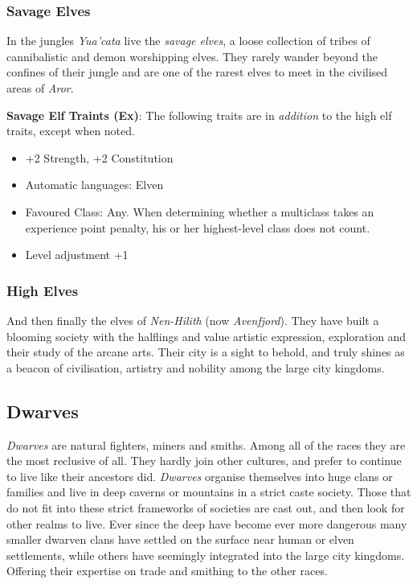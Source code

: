 \subsubsection*{Savage Elves}

In the jungles \emph{Yua'cata} live the \emph{savage elves}, a loose
collection of tribes of cannibalistic and demon worshipping elves. They rarely
wander beyond the confines of their jungle and are one of the rarest elves to
meet in the civilised areas of \emph{Aror}.

\begin{35e}
  \textbf{Savage Elf Traints (Ex)}: The following traits are in \emph{addition}
  to the high elf traits, except when noted.
  \begin{itemize}[noitemsep]
    \item +2 Strength, +2 Constitution
    \item Automatic languages: Elven
    \item Favoured Class: Any. When determining whether a multiclass takes an
    experience point penalty, his or her highest-level class does not count.
    \item Level adjustment +1
  \end{itemize}
\end{35e}

\subsubsection*{High Elves}

And then finally the elves of \emph{Nen-Hilith} (now \emph{Avenfjord}). They
have built a blooming society with the halflings and value artistic expression,
exploration and their study of the arcane arts. Their city is a sight to behold,
and truly shines as a beacon of civilisation, artistry and nobility among the
large city kingdoms.

\subsection*{Dwarves}

\emph{Dwarves} are natural fighters, miners and smiths. Among all of the races
they are the most reclusive of all. They hardly join other cultures, and
prefer to continue to live like their ancestors did. \emph{Dwarves} organise
themselves into huge clans or families and live in deep caverns or mountains
in a strict caste society. Those that do not fit into these strict frameworks
of societies are cast out, and then look for other realms to live. Ever since
the deep have become ever more dangerous many smaller dwarven clans have
settled on the surface near human or elven settlements, while others have
seemingly integrated into the large city kingdoms. Offering their expertise on
trade and smithing to the other races.

